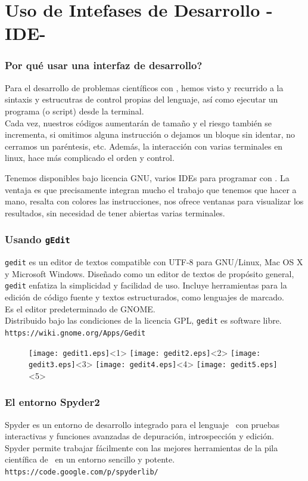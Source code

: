 \section{Uso de Intefases de Desarrollo -IDE-}
\begin{frame}
\frametitle{Por qué usar una interfaz de desarrollo?}
Para el desarrollo de problemas científicos con \python, hemos visto y recurrido a la sintaxis y estrucutras de control propias del lenguaje, así como ejecutar un programa (o script) desde la terminal.
\\
\medskip
Cada vez, nuestros códigos aumentarán de tamaño y el riesgo también se incrementa, si omitimos alguna instrucción o dejamos un bloque sin identar, no cerramos un paréntesis, etc. Además, la interacción con varias terminales en linux, hace más complicado el orden y control.
\end{frame}
\begin{frame}
Tenemos disponibles bajo licencia GNU, varios IDEs para programar con \python. La ventaja es que precisamente integran mucho el trabajo que tenemos que hacer a mano, resalta con colores las instrucciones, nos ofrece ventanas para visualizar los resultados, sin necesidad de tener abiertas varias terminales.
\end{frame}
\begin{frame}
\frametitle{Usando \texttt{gEdit}}
\texttt{gedit} es un editor de textos compatible con UTF-8 para GNU/Linux, Mac OS X y Microsoft Windows. Diseñado como un editor de textos de propósito general, \texttt{gedit} enfatiza la simplicidad y  facilidad de uso. Incluye herramientas para la edición de código fuente y textos estructurados, como lenguajes de marcado.
\\
\medskip
Es el editor predeterminado de GNOME.
\\
\medskip
Distribuido bajo las condiciones de la licencia GPL, \texttt{gedit} es software libre.\\
\medskip
\texttt{https://wiki.gnome.org/Apps/Gedit}
\end{frame}
\begin{frame}[fragile]
\begin{figure}
	\centering
	\texttt{[image: gedit1.eps]}<1> 
	\texttt{[image: gedit2.eps]}<2>
	\texttt{[image: gedit3.eps]}<3>
	\texttt{[image: gedit4.eps]}<4>
	\texttt{[image: gedit5.eps]}<5>
\end{figure}
\end{frame}
\begin{frame}
\frametitle{El entorno Spyder2}
Spyder es un entorno de desarrollo integrado para el lenguaje \python\ con pruebas interactivas y funciones avanzadas de depuración, introspección y edición.
\\
\medskip
Spyder permite trabajar fácilmente con las mejores herramientas de la pila científica de \python\ en un entorno sencillo y potente.
\\
\medskip
\texttt{https://code.google.com/p/spyderlib/}
\end{frame}
